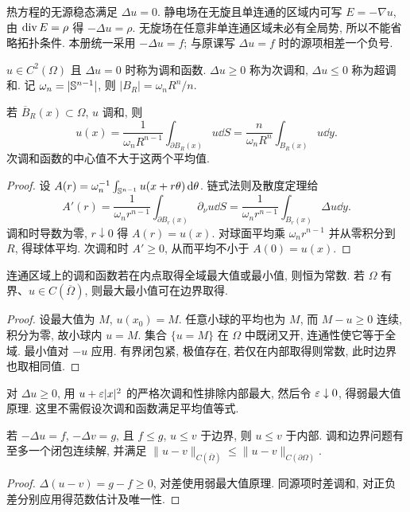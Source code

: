 \label{ch:harmonic}
热方程的无源稳态满足 $\Delta u=0$. 静电场在无旋且单连通的区域内可写 $E=-\nabla u$, 由 $\operatorname{div} E=\rho$ 得 $-\Delta u=\rho$. 无旋场在任意非单连通区域未必有全局势, 所以不能省略拓扑条件. 本册统一采用 $-\Delta u=f$; 与原课写 $\Delta u=f$ 时的源项相差一个负号.
\begin{definition}
$u\in C^2(\Omega)$ 且 $\Delta u=0$ 时称为调和函数. $\Delta u\ge0$ 称为次调和, $\Delta u\le0$ 称为超调和. 记 $\omega_n=|\mathbb S^{n-1}|$, 则 $|B_R|=\omega_n R^n/n$.
\end{definition}
\begin{theorem}\label{thm:meanvalue}
若 $\overline B_R(x)\subset\Omega$, $u$ 调和, 则
\[
u(x)=\frac1{\omega_nR^{n-1}}\int_{\partial B_R(x)}u\dd S
=\frac n{\omega_nR^n}\int_{B_R(x)}u\dd y.
\]
次调和函数的中心值不大于这两个平均值.
\end{theorem}
\begin{proof}
设 $A(r)=\omega_n^{-1}\int_{\mathbb S^{n-1}}u(x+r\theta)\,\mathrm d\theta$. 链式法则及散度定理给
\[
A'(r)=\frac1{\omega_nr^{n-1}}\int_{\partial B_r(x)}\partial_\nu u\dd S
=\frac1{\omega_nr^{n-1}}\int_{B_r(x)}\Delta u\dd y.
\]
调和时导数为零, $r\downarrow0$ 得 $A(r)=u(x)$. 对球面平均乘 $\omega_nr^{n-1}$ 并从零积分到 $R$, 得球体平均. 次调和时 $A'\ge0$, 从而平均不小于 $A(0)=u(x)$.
\end{proof}
\begin{theorem}\label{thm:strongharmonic}
连通区域上的调和函数若在内点取得全域最大值或最小值, 则恒为常数. 若 $\Omega$ 有界、$u\in C(\overline\Omega)$, 则最大最小值可在边界取得.
\end{theorem}
\begin{proof}
设最大值为 $M$, $u(x_0)=M$. 任意小球的平均也为 $M$, 而 $M-u\ge0$ 连续, 积分为零, 故小球内 $u=M$. 集合 $\{u=M\}$ 在 $\Omega$ 中既闭又开, 连通性使它等于全域. 最小值对 $-u$ 应用. 有界闭包紧, 极值存在, 若仅在内部取得则常数, 此时边界也取相同值.
\end{proof}
对 $\Delta u\ge0$, 用 $u+\varepsilon|x|^2$ 的严格次调和性排除内部最大, 然后令 $\varepsilon\downarrow0$, 得弱最大值原理. 这里不需假设次调和函数满足平均值等式.
\begin{corollary}\label{cor:poissoncomparison}
若 $-\Delta u=f$, $-\Delta v=g$, 且 $f\le g$, $u\le v$ 于边界, 则 $u\le v$ 于内部. 调和边界问题有至多一个闭包连续解, 并满足 $\|u-v\|_{C(\overline\Omega)}\le\|u-v\|_{C(\partial\Omega)}$.
\end{corollary}
\begin{proof}
$\Delta(u-v)=g-f\ge0$, 对差使用弱最大值原理. 同源项时差调和, 对正负差分别应用得范数估计及唯一性.
\end{proof}
